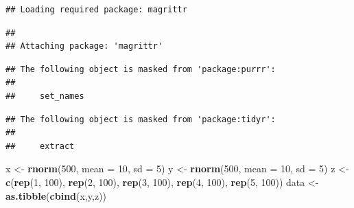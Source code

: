 \documentclass[]{article}
\newenvironment{Shaded}{\begin{snugshade}}{\end{snugshade}}
\newcommand{\KeywordTok}[1]{\textcolor[rgb]{0.13,0.29,0.53}{\textbf{#1}}}
\newcommand{\DataTypeTok}[1]{\textcolor[rgb]{0.13,0.29,0.53}{#1}}
\newcommand{\DecValTok}[1]{\textcolor[rgb]{0.00,0.00,0.81}{#1}}
\newcommand{\StringTok}[1]{\textcolor[rgb]{0.31,0.60,0.02}{#1}}
\newcommand{\NormalTok}[1]{#1}
\begin{document}
\begin{verbatim}
## Loading required package: magrittr
\end{verbatim}

\begin{verbatim}
## 
## Attaching package: 'magrittr'
\end{verbatim}

\begin{verbatim}
## The following object is masked from 'package:purrr':
## 
##     set_names
\end{verbatim}

\begin{verbatim}
## The following object is masked from 'package:tidyr':
## 
##     extract
\end{verbatim}

\begin{Shaded}
\begin{Highlighting}[]
\NormalTok{x <-}\StringTok{ }\KeywordTok{rnorm}\NormalTok{(}\DecValTok{500}\NormalTok{, }\DataTypeTok{mean =} \DecValTok{10}\NormalTok{, }\DataTypeTok{sd =} \DecValTok{5}\NormalTok{)}
\NormalTok{y <-}\StringTok{ }\KeywordTok{rnorm}\NormalTok{(}\DecValTok{500}\NormalTok{, }\DataTypeTok{mean =} \DecValTok{10}\NormalTok{, }\DataTypeTok{sd =} \DecValTok{5}\NormalTok{)}
\NormalTok{z <-}\StringTok{ }\KeywordTok{c}\NormalTok{(}\KeywordTok{rep}\NormalTok{(}\DecValTok{1}\NormalTok{, }\DecValTok{100}\NormalTok{), }\KeywordTok{rep}\NormalTok{(}\DecValTok{2}\NormalTok{, }\DecValTok{100}\NormalTok{), }\KeywordTok{rep}\NormalTok{(}\DecValTok{3}\NormalTok{, }\DecValTok{100}\NormalTok{), }\KeywordTok{rep}\NormalTok{(}\DecValTok{4}\NormalTok{, }\DecValTok{100}\NormalTok{), }\KeywordTok{rep}\NormalTok{(}\DecValTok{5}\NormalTok{, }\DecValTok{100}\NormalTok{))}
\NormalTok{data <-}\StringTok{ }\KeywordTok{as.tibble}\NormalTok{(}\KeywordTok{cbind}\NormalTok{(x,y,z))}


\end{Highlighting}
\end{Shaded}
\end{document}
